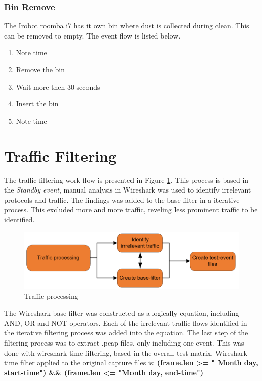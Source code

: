 \subsubsection{Bin Remove}
The Irobot roomba i7 has it own bin where dust is collected during clean. This can be removed to empty. The event flow is listed below. 

\begin{enumerate}
                                    \item Note time
                                    \item Remove the bin
                                    \item Wait  more then 30 seconds
                                    \item Insert the bin
                                    \item Note time
 \end{enumerate}


\section{Traffic Filtering}
The traffic filtering work flow is presented in Figure \ref{fig:TrafficProcessingProcess}. This process is based in the \textit{Standby event}, manual analysis in Wireshark was used to identify irrelevant protocols and traffic. The findings was added to the base filter in a iterative process. This excluded more and more traffic, reveling less prominent traffic to be identified.  

\begin{figure}[H]
    \centering
    \includegraphics[width=\textwidth]{figures/TrafficProcessingProcess.png}
    \caption{Traffic processing}
    \label{fig:TrafficProcessingProcess}
\end{figure}

The Wireshark base filter was constructed as a logically equation, including AND, OR and NOT operators. Each of the irrelevant traffic flows identified in the iterative filtering process was added into the equation. The last step of the filtering process was to extract .pcap files, only including one event. This was done with wireshark time filtering, based in the overall test matrix. Wireshark time filter applied to the original capture files is:
\textbf{(frame.len >= " Month day, start-time") \&\& (frame.len <= "Month day, end-time")}


